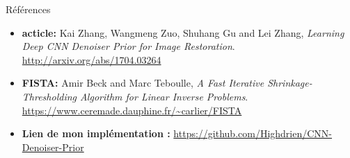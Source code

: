 \documentclass[11pt]{beamer}
\begin{document}
\begin{frame}{Références}
    \begin{itemize}
        \item \textbf{acticle:} Kai Zhang, Wangmeng Zuo, Shuhang Gu and Lei Zhang, 
            \textit{Learning Deep {CNN} Denoiser Prior for Image Restoration}.
            \url{http://arxiv.org/abs/1704.03264}
        \item \textbf{FISTA:} Amir Beck and Marc Teboulle, \textit{A Fast Iterative Shrinkage-Thresholding 
        Algorithm for Linear Inverse Problems}. \url{https://www.ceremade.dauphine.fr/~carlier/FISTA}
        \item \textbf{Lien de mon implémentation :} \url{https://github.com/Highdrien/CNN-Denoiser-Prior}
    \end{itemize}
    
\end{frame}
\end{document}
